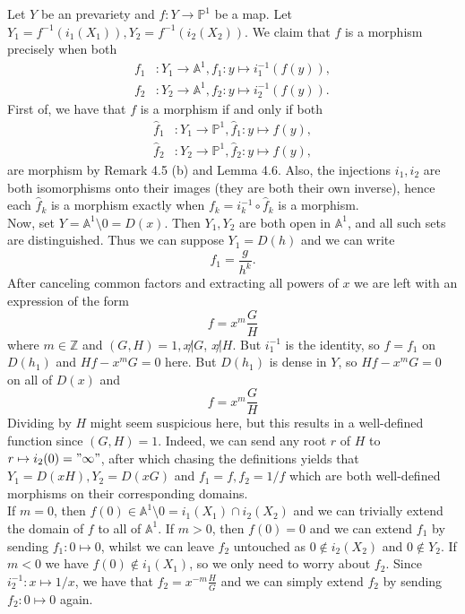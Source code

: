 \documentclass{article}
\theoremstyle{definition}
\newcommand{\Z}{\mathbb{Z}}
\renewcommand{\P}{\mathbb{P}}
\newcommand{\A}{\mathbb{A}}
\renewcommand{\AA}[1]{\A^{#1}}
\newcommand{\PP}[1]{\P^{#1}}
\begin{document}
Let $Y$ be an prevariety and $f : Y \to \PP{1}$ be a map. Let $Y_1 =
f^{-1}(i_1(X_1)), Y_2 = f^{-1}(i_2(X_2))$. We claim that $f$ is a morphism
precisely when both
\begin{align*}
	f_1 &: Y_1 \to \AA{1}, f_1 : y \mapsto i_1^{-1}(f(y)), \\ 
	f_2 &: Y_2 \to \AA{1}, f_2 : y \mapsto i_2^{-1}(f(y)).
\end{align*}
First of, we have that $f$ is a morphism if and only if both
\begin{align*}
	\hat{f}_1 &: Y_1 \to \PP{1}, \hat{f}_1 : y \mapsto f(y), \\ 
	\hat{f}_2 &: Y_2 \to \PP{1}, \hat{f}_2 : y \mapsto f(y), 
\end{align*}
are morphism by Remark 4.5 (b) and Lemma 4.6. Also, the injections $i_1, i_2$
are both isomorphisms onto their images (they are both their own inverse),
hence each $\hat{f}_k$ is a morphism exactly when $f_k = i_k^{-1} \circ
\hat{f}_k$ is a morphism. \\

Now, set $Y = \AA{1} \setminus 0 = D(x)$. Then $Y_1, Y_2$ are both open in
$\AA{1}$, and all such sets are distinguished. Thus we can suppose $Y_1 =
D(h)$ and we can write
\[
	f_1 = \frac{g}{h^{k}}.
\]
After canceling common factors and extracting all powers of $x$
we are left with an expression of the form
\[
	f = x^{m} \frac{G}{H}
\] 
where $m \in \Z$ and $(G, H) = 1, x \not | G$, $x \not | H$. But $i_1^{-1}$ is
the identity, so $f = f_1$ on $D(h_1)$ and $H f - x^{m} G = 0$ here. But
$D(h_1)$ is dense in $Y$, so $H f - x^{m} G = 0$ on all of $D(x)$ and 
\[
	f = x^{m} \frac{G}{H}
\] 
Dividing by $H$ might seem suspicious here, but this results in a well-defined
function since $(G, H) = 1$. Indeed, we can send any root $r$ of $H$ to $r
\mapsto i_2(0) = "\infty"$, after which chasing the definitions yields that $Y_1
= D(xH), Y_2 = D(xG)$ and $f_1 = f, f_2 = 1/f$ which are both well-defined
morphisms on their corresponding domains. \\ 

If $m = 0$, then $f(0) \in \AA{1} \setminus 0 = i_1(X_1)
\cap i_2(X_2)$ and we can trivially extend the domain of $f$ to all of
$\AA{1}$. If $m > 0$, then $f(0) = 0$ and we can extend $f_1$ by sending $f_1 :
0 \mapsto 0$, whilst we can leave $f_2$ untouched as $0 \not \in i_2(X_2)$ and
$0 \not \in Y_2$. If $m < 0$ we have $f(0) \not \in i_1(X_1)$, so we only need
to worry about $f_2$. Since $i_2^{-1} : x \mapsto 1/x$, we have that $f_2 =
x^{-m} \frac{H}{G}$ and we can simply extend $f_2$ by sending $f_2 : 0 \mapsto
0$ again.
\end{document}

